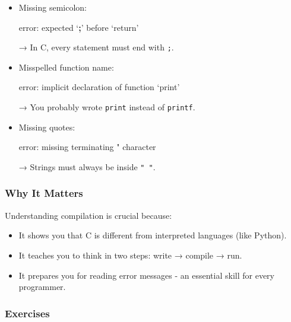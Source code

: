 \documentclass[
  letterpaper,
  DIV=11,
  numbers=noendperiod]{scrreprt}
\newenvironment{Shaded}{\begin{snugshade}}{\end{snugshade}}
\newcommand{\ExtensionTok}[1]{\textcolor[rgb]{0.00,0.23,0.31}{#1}}
\newcommand{\KeywordTok}[1]{\textcolor[rgb]{0.00,0.23,0.31}{\textbf{#1}}}
\newcommand{\NormalTok}[1]{\textcolor[rgb]{0.00,0.23,0.31}{#1}}
\newcommand{\StringTok}[1]{\textcolor[rgb]{0.13,0.47,0.30}{#1}}
\providecommand{\tightlist}{%
  \setlength{\itemsep}{0pt}\setlength{\parskip}{0pt}}
\begin{document}
\begin{itemize}
\item
  Missing semicolon:

\begin{Shaded}
\begin{Highlighting}[]
\ExtensionTok{error:}\NormalTok{ expected ‘}\KeywordTok{;}\ExtensionTok{’}\NormalTok{ before ‘return’}
\end{Highlighting}
\end{Shaded}

  → In C, every statement must end with \texttt{;}.
\item
  Misspelled function name:

\begin{Shaded}
\begin{Highlighting}[]
\ExtensionTok{error:}\NormalTok{ implicit declaration of function ‘print’}
\end{Highlighting}
\end{Shaded}

  → You probably wrote \texttt{print} instead of \texttt{printf}.
\item
  Missing quotes:

\begin{Shaded}
\begin{Highlighting}[]
\ExtensionTok{error:}\NormalTok{ missing terminating }\StringTok{" character}
\end{Highlighting}
\end{Shaded}

  → Strings must always be inside \texttt{"\ "}.
\end{itemize}

\subsubsection{Why It Matters}\label{why-it-matters-2}

Understanding compilation is crucial because:

\begin{itemize}
\tightlist
\item
  It shows you that C is different from interpreted languages (like
  Python).
\item
  It teaches you to think in two steps: write → compile → run.
\item
  It prepares you for reading error messages - an essential skill for
  every programmer.
\end{itemize}

\subsubsection{Exercises}\label{exercises-2}
\end{document}
